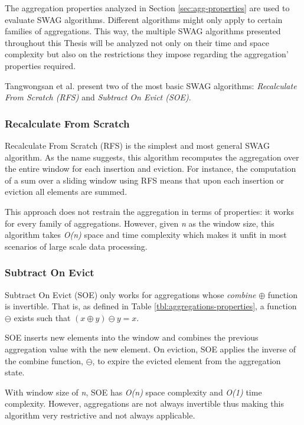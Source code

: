 The aggregation properties analyzed in Section \ref{sec:agg-properties} are used to evaluate SWAG algorithms. Different algorithms might only apply to certain families of aggregations. This way, the multiple SWAG algorithms presented throughout this Thesis will be analyzed not only on their time and space complexity but also on the restrictions they impose regarding the aggregation' properties required.

Tangwongsan et al. present two of the most basic SWAG algorithms: \textit{Recalculate From Scratch (RFS)} and \textit{Subtract On Evict (SOE)}.

\subsubsection{Recalculate From Scratch}
Recalculate From Scratch (RFS) is the simplest and most general SWAG algorithm. As the name suggests, this algorithm recomputes the aggregation over the entire window for each insertion and eviction. For instance, the computation of a sum over a sliding window using RFS means that upon each insertion or eviction all elements are summed.

This approach does not restrain the aggregation in terms of properties: it works for every family of aggregations. However, given \textit{n} as the window size, this algorithm takes \textit{O(n)} space and time complexity which makes it unfit in most scenarios of large scale data processing. 

\subsubsection{Subtract On Evict}
Subtract On Evict (SOE) only works for aggregations whose  \textit{combine} $\oplus$ function is invertible. That is, as defined in Table \ref{tbl:aggregations-properties}, a function $\ominus$ exists such that $(x \oplus y) \ominus y = x$.

SOE inserts new elements into the window and combines the previous aggregation value with the new element. On eviction, SOE applies the inverse of the combine function, $\ominus$, to expire the evicted element from the aggregation state.

With window size of \textit{n}, SOE has \textit{O(n)} space complexity and \textit{O(1)} time complexity. However, aggregations are not always invertible thus making this algorithm very restrictive and not always applicable.


